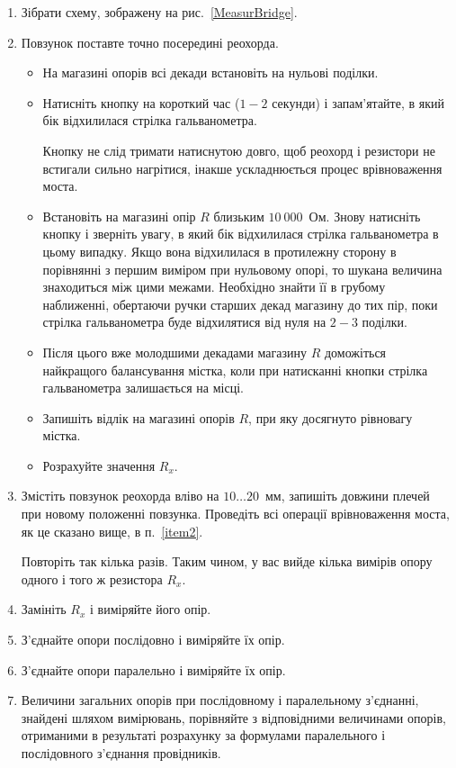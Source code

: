 \documentclass{LabWork}
\begin{document}
\begin{enumerate}
	\item Зібрати схему, зображену на рис.~\ref{MeasurBridge}.
	\item Повзунок поставте точно посередині реохорда. \label{item2}
	      \begin{itemize}
		      \item На магазині опорів всі декади встановіть на нульові поділки.
		      \item  Натисніть кнопку на короткий час ($1 - 2$ секунди) і запам'ятайте, в який бік відхилилася стрілка гальванометра.
                \begin{More}
                
		            Кнопку не слід тримати натиснутою довго, щоб реохорд і резистори не встигали сильно нагрітися, інакше ускладнюється процес врівноваження моста.
                
                \end{More}


		      \item Встановіть на магазині опір $R$ близьким $10\ 000$~Ом. Знову натисніть кнопку і зверніть увагу, в який бік
		            відхилилася стрілка гальванометра в цьому випадку. Якщо вона відхилилася в протилежну сторону в порівнянні з першим виміром при нульовому опорі, то шукана величина знаходиться між цими межами. Необхідно знайти її в грубому наближенні, обертаючи ручки старших декад магазину до тих пір, поки стрілка гальванометра буде відхилятися від нуля на $2-3$ поділки.
		      \item Після цього вже молодшими декадами магазину $R$ доможіться найкращого балансування містка, коли при натисканні кнопки стрілка гальванометра залишається на місці.
		      \item Запишіть відлік на магазині опорів $R$, при яку досягнуто рівновагу містка.
		      \item Розрахуйте значення $R_x$.
	      \end{itemize}
	\item Змістіть повзунок реохорда вліво на $10 \ldots 20$~мм, запишіть довжини плечей при новому положенні повзунка. Проведіть всі операції врівноваження моста, як це сказано вище, в п.~\ref{item2}.

	      Повторіть так кілька разів. Таким чином, у вас вийде кілька вимірів опору одного і того ж резистора $R_x$.
	\item Замініть $R_x$ і виміряйте його опір.
	\item З'єднайте опори послідовно і виміряйте їх опір.
	\item З'єднайте опори паралельно і виміряйте їх опір.
	\item Величини загальних опорів при послідовному і паралельному з'єднанні, знайдені шляхом вимірювань, порівняйте з відповідними величинами опорів, отриманими в результаті розрахунку за формулами паралельного і послідовного з'єднання провідників.
\end{enumerate}
\end{document}
